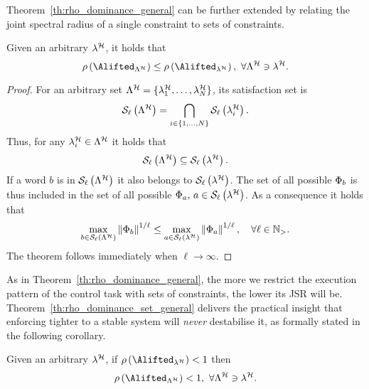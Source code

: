 Theorem~\ref{th:rho_dominance_general} can be further extended by relating the joint spectral radius of a single constraint to sets of constraints.
\begin{theorem}%
    \label{th:rho_dominance_set_general}%
    Given an arbitrary \ewhc{} $\lambda^{\mathcal{H}}$, it holds that
    $$
        \rho\left(\Alifted_{\Lambda^\strat}\right) \leq \rho \left( \Alifted_{\lambda^\strat} \right) ,\,\, \forall \Lambda^\strat \ni \lambda^\strat.
    $$
    \begin{proof}
        For an arbitrary \ewhc{} set $\Lambda^{\mathcal{H}} = \{\lambda^{\mathcal{H}}_1, \dots, \lambda^{\mathcal{H}}_N\}$, its satisfaction set is
        $$
            \mathcal{S}_{\ell}\left( \Lambda^{\mathcal{H}} \right) = \bigcap_{i \in \{1,\dots, N\}} \mathcal{S}_{\ell}\left( \lambda^{\mathcal{H}}_i \right).
        $$
        Thus, for any $\lambda^{\mathcal{H}}_i \in \Lambda^{\mathcal{H}}$ it holds that 
        $$
            \mathcal{S}_{\ell}\left(  \Lambda^{\mathcal{H}}  \right) \subseteq \mathcal{S}_{\ell}\left( \lambda^{\mathcal{H}} \right).
        $$
        If a word $b$ is in $\mathcal{S}_{\ell}\left( \Lambda^{\mathcal{H}} \right)$ it also belongs to $\mathcal{S}_{\ell}\left( \lambda^{\mathcal{H}} \right)$. 
        The set of all possible $\Phi_{b}$ is thus included in the set of all possible $\Phi_{a},\, a \in \mathcal{S}_{\ell}\left( \lambda^{\mathcal{H}} \right)$.
        As a consequence it holds that
        \begin{equation*}
            \max_{b \in \mathcal{S}_{\ell}\left( \Lambda^{\mathcal{H}} \right)} \left\lVert\Phi_{b}\right\rVert^{1/\ell} \leq
            \max_{a \in \mathcal{S}_{\ell}\left( \lambda^{\mathcal{H}} \right)} \left\lVert\Phi_{a}\right\rVert^{1/\ell}, \quad
            \forall \ell \in \mathbb{N}_{>}.
        \end{equation*}
        The theorem follows immediately when $\ell\rightarrow \infty$.
    \end{proof}
\end{theorem}

As in Theorem~\ref{th:rho_dominance_general}, the more we restrict the execution pattern of the control task with sets of constraints, the lower its JSR will be.
%
Theorem~\ref{th:rho_dominance_set_general} delivers the practical insight that enforcing tighter \ewhc{} to a stable system will \emph{never} destabilise it, as formally stated in the following corollary.
\begin{corollary}%
    \label{cor:rho_dominance_set}%
    Given an arbitrary \ewhc{} $\lambda^{\mathcal{H}}$, if $\rho \left( \Alifted_{\lambda^\strat} \right) < 1$ then
    $$
        \rho\left(\Alifted_{\Lambda^\strat}\right) < 1 ,\,\, \forall \Lambda^\strat \ni \lambda^\strat.
    $$
\end{corollary}
